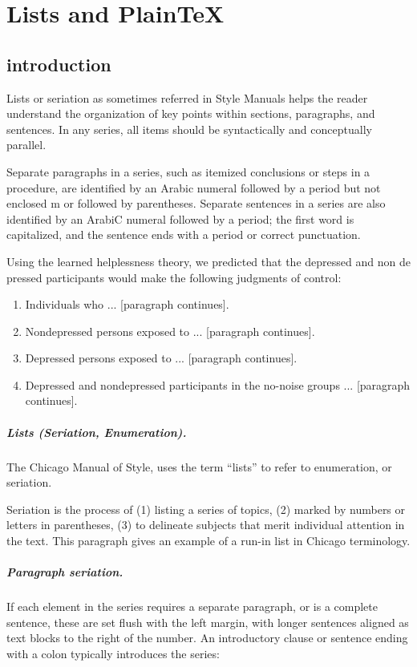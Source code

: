 \chapter{Lists and PlainTeX}

\section{introduction}

Lists or seriation as sometimes referred in Style Manuals helps the reader understand the organization of key points within sections, paragraphs,
and sentences. In any series, all items should be syntactically and conceptually
parallel.

Separate paragraphs in a series, such as itemized conclusions or steps in a procedure,
are identified by an Arabic numeral followed by a period but not enclosed m or
followed by parentheses. Separate sentences in a series are also identified by an ArabiC
numeral followed by a period; the first word is capitalized, and the sentence ends with
a period or correct punctuation.

Using the learned helplessness theory, we predicted that the depressed and
non de pressed participants would make the following judgments of control:

\begin{enumerate}
  \item Individuals who ... [paragraph continues].
  \item Nondepressed persons exposed to ... [paragraph continues].
  \item Depressed persons exposed to ... [paragraph continues].
  \item Depressed and nondepressed participants in the no-noise groups ... [paragraph continues].
\end{enumerate}

\paragraph{Lists (Seriation, Enumeration).} The Chicago Manual of Style, uses the term \enquote{lists} to refer to enumeration, or seriation.

Seriation is the process of (1) listing a series of topics, (2) marked by numbers or letters in parentheses,
(3) to delineate subjects that merit individual attention in the text. This paragraph gives an example of a
run-in list in Chicago terminology. 

\paragraph{Paragraph seriation.} If each element in the series requires a separate paragraph, or is a complete
sentence, these are set flush with the left margin, with longer sentences aligned as text blocks to the right
of the number. An introductory clause or sentence ending with a colon typically introduces the series:


